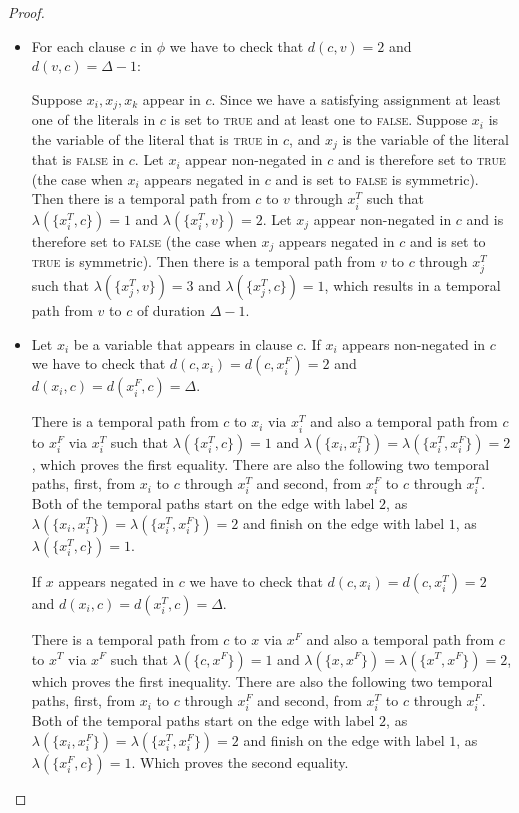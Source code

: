 \documentclass[a4paper,UKenglish,cleveref, autoref, thm-restate]{lipics-v2021}
\begin{document}
\begin{proof}
\begin{itemize}
    \item For each clause $c$ in $\phi$ we have to check that $d(c,v)=2$
    and $d(v,c)=\Delta - 1$:

    Suppose $x_i,x_j,x_k$ appear in $c$.
    Since we have a satisfying assignment at least one of the literals in $c$ is set to \textsc{true} and at least one to \textsc{false}. 
    Suppose $x_i$ is the variable of the literal that is \textsc{true} in $c$,
    and $x_j$ is the variable of the literal that is \textsc{false} in $c$.
    Let $x_i$ appear non-negated in $c$ and is therefore set to \textsc{true} (the case when $x_i$ appears negated in $c$ and is set to \textsc{false} is symmetric).
    Then there is a temporal path from $c$ to $v$ through $x_i^T$ such that $\lambda(\{x_i^T, c\})=1$ and $\lambda(\{x_i^T, v\})=2$. 
    Let $x_j$ appear non-negated in $c$ and is therefore set to \textsc{false} 
    (the case when $x_j$ appears negated in $c$ and is set to \textsc{true} is symmetric).
    Then there is a temporal path from $v$ to $c$ through $x_j^T$ such that $\lambda(\{x_j^T, v\})=3$ and $\lambda(\{x_j^T, c\})=1$,
    which results in a temporal path from $v$ to $c$ of duration $\Delta -1$.
    
    \item Let $x_i$ be a variable that appears in clause $c$.
    If $x_i$ appears non-negated in $c$ we have to check that $d(c,x_i)=d(c,x_i^F)=2$
    and $d(x_i,c)=d(x_i^F,c)= \Delta$.

    There is a temporal path from $c$ to $x_i$ via $x_i^T$ and also a temporal path from $c$ to $x_i^F$ via $x_i^T$ such that $\lambda(\{x_i^T, c\})=1$ and $\lambda(\{x_i, x_i^T\})=\lambda(\{x_i^T, x_i^F\})=2$,
    which proves the first equality.
    There are also the following two temporal paths,
    first, from $x_i$ to $c$ through $x_i^T$ and
    second, from $x_i^F$ to $c$ through $x_i^T$.
    Both of the temporal paths start on the edge with label $2$, as 
    $\lambda(\{x_i, x_i^T\}) = \lambda (\{x_i^T, x_i^F\})=2$ and 
    finish on the edge with label $1$, as $\lambda(\{x_i^T, c\}) = 1$.

    If $x$ appears negated in $c$ we have to check that 
    $d(c,x_i)=d(c,x_i^T)=2$
    and $d(x_i,c)=d(x_i^T,c)= \Delta$.

    There is a temporal path from $c$ to $x$ via $x^F$ and also a temporal path from $c$ to $x^T$ via $x^F$ such that $\lambda(\{c, x^F\})=1$ and $\lambda(\{x, x^F\})=\lambda(\{x^T, x^F\})=2$,
    which proves the first inequality.
    There are also the following two temporal paths,
    first, from $x_i$ to $c$ through $x_i^F$ and
    second, from $x_i^T$ to $c$ through $x_i^F$.
    Both of the temporal paths start on the edge with label $2$, as 
    $\lambda(\{x_i, x_i^F\}) = \lambda (\{x_i^T, x_i^F\})=2$ and 
    finish on the edge with label $1$, as $\lambda(\{x_i^F, c\}) = 1$.
    Which proves the second equality.
    

\end{itemize}
\end{proof}
\end{document}
